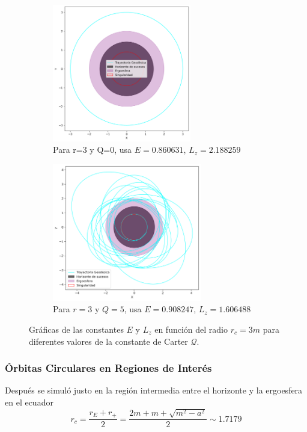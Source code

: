 \begin{figure}[H]

\begin{subfigure}{0.5\textwidth}
\includegraphics[width=0.9\linewidth, height=6cm]{AgujerosNegros/kerr/geodesics_plots/geodesica_circular_r3_Q0_planoxy.png} 
\caption{Para r=3 y Q=0, usa $E=0.860631$, $L_z=2.188259$}
\end{subfigure}
\begin{subfigure}{0.5\textwidth}
\includegraphics[width=0.9\linewidth, height=6cm]{AgujerosNegros/kerr/geodesics_plots/geodesica_circular_r3_Q5_planoxy.png}
\caption{Para $r=3$ y $Q=5$, usa $E=0.908247$, $L_z=1.606488$}

\end{subfigure}

\caption{Gráficas de las constantes $E$ y $L_z$ en función del radio $r_c = 3m$ para diferentes valores de la constante de Carter $\mathcal{Q}$.}
\end{figure}

\subsubsection{Órbitas Circulares en Regiones de Interés}
Después se simuló justo en la región intermedia entre el horizonte y la ergoesfera en el ecuador
\begin{equation}
    r_c =\frac{r_E + r_+}{2}=\frac{2m + m +\sqrt{m^2-a^2}}{2}\sim 1.7179
\end{equation}

